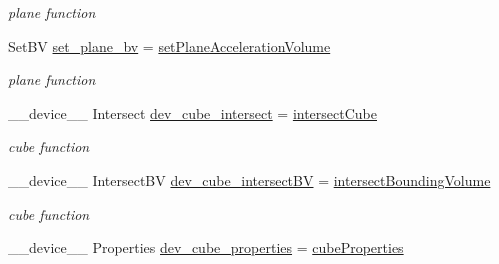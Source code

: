 \begin{DoxyCompactItemize}
\begin{DoxyCompactList}\small\item\em plane function \end{DoxyCompactList}\item 
Set\+BV \hyperlink{group__device__pointers_gadad9e63712118e3425b0e754615f70d4}{set\+\_\+plane\+\_\+bv} = \hyperlink{group__intersection__test__prperties_ga684f41eb2add27e32a7c0115cdd6cce1}{set\+Plane\+Acceleration\+Volume}\hypertarget{group__device__pointers_gadad9e63712118e3425b0e754615f70d4}{}\label{group__device__pointers_gadad9e63712118e3425b0e754615f70d4}

\begin{DoxyCompactList}\small\item\em plane function \end{DoxyCompactList}\item 
\+\_\+\+\_\+device\+\_\+\+\_\+ Intersect \hyperlink{group__device__pointers_gafba3ff50c17e36337c7578ead7cc6f1e}{dev\+\_\+cube\+\_\+intersect} = \hyperlink{group__intersection__test__prperties_gae4778d3b0c160c9757d7fca0e5deefa2}{intersect\+Cube}\hypertarget{group__device__pointers_gafba3ff50c17e36337c7578ead7cc6f1e}{}\label{group__device__pointers_gafba3ff50c17e36337c7578ead7cc6f1e}

\begin{DoxyCompactList}\small\item\em cube function \end{DoxyCompactList}\item 
\+\_\+\+\_\+device\+\_\+\+\_\+ Intersect\+BV \hyperlink{group__device__pointers_ga0d5bc928c76877f9dd81cb8580b7fc1e}{dev\+\_\+cube\+\_\+intersect\+BV} = \hyperlink{group__intersection__test__prperties_gaf6bbee9e8a6ee564017fa94cd9e6ec63}{intersect\+Bounding\+Volume}\hypertarget{group__device__pointers_ga0d5bc928c76877f9dd81cb8580b7fc1e}{}\label{group__device__pointers_ga0d5bc928c76877f9dd81cb8580b7fc1e}

\begin{DoxyCompactList}\small\item\em cube function \end{DoxyCompactList}\item 
\+\_\+\+\_\+device\+\_\+\+\_\+ Properties \hyperlink{group__device__pointers_ga2d4562e3ca58496f57bb1d3cff526d25}{dev\+\_\+cube\+\_\+properties} = \hyperlink{group__intersection__test__prperties_ga33e6e14712999e0675085b5479201656}{cube\+Properties}\hypertarget{group__device__pointers_ga2d4562e3ca58496f57bb1d3cff526d25}{}\label{group__device__pointers_ga2d4562e3ca58496f57bb1d3cff526d25}


\end{DoxyCompactItemize}
